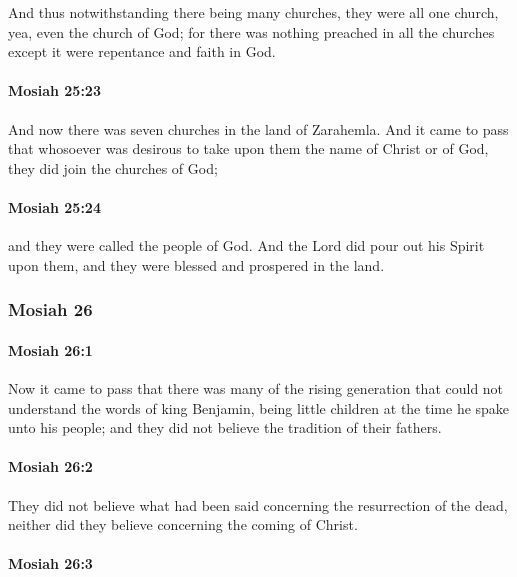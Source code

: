 			And thus notwithstanding there being many churches,
			they were all one church,
			yea, even the church of God;
			for there was nothing preached in all the churches
			except it were repentance and faith in God.

		\paragraph{Mosiah 25:23} %
			\label{MOSIAH-25-23}

			And now there was seven churches in the land of Zarahemla.
			And it came to pass that
			whosoever was desirous to take upon them the name of Christ or of God,
			they did join the churches of God;

		\paragraph{Mosiah 25:24} %
			\label{MOSIAH-25-24}

			and they were called the people of God.
			And the Lord did pour out his Spirit upon them,
			and they were blessed and prospered in the land.

	\subsubsection{Mosiah 26} %
		\label{MOSIAH-26}
		
		\paragraph{Mosiah 26:1} %
			\label{MOSIAH-26-1}
			
			Now it came to pass that there was many of the rising generation
			that could not understand the words of king Benjamin,
			being little children at the time he spake unto his people;
			and they did not believe the tradition of their fathers.

		\paragraph{Mosiah 26:2} %
			\label{MOSIAH-26-2}

			They did not believe what had been said concerning the resurrection of the dead,
			neither did they believe concerning the coming of Christ.

		\paragraph{Mosiah 26:3} %
			\label{MOSIAH-26-3}

